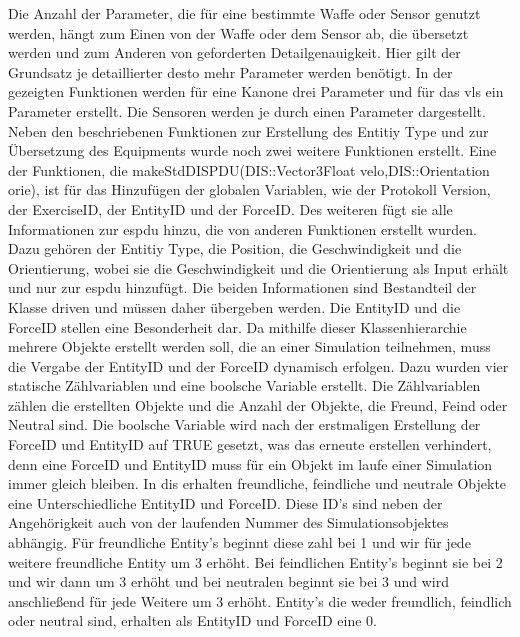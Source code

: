 Die Anzahl der Parameter, die für eine bestimmte Waffe oder Sensor genutzt werden, hängt zum Einen von der Waffe oder dem Sensor ab, die übersetzt werden und zum Anderen von geforderten Detailgenauigkeit. Hier gilt der Grundsatz je detaillierter desto mehr Parameter werden benötigt. In der gezeigten Funktionen werden für eine Kanone drei Parameter und für das \ac{vls} ein Parameter  erstellt. Die Sensoren werden je durch einen Parameter dargestellt.\\ 
Neben den beschriebenen Funktionen zur Erstellung des \glqq Entitiy Type\grqq{} und zur Übersetzung des Equipments wurde noch zwei weitere Funktionen erstellt. Eine der Funktionen, die  \glqq makeStdDISPDU(DIS::Vector3Float velo,DIS::Orientation orie)\grqq{}, ist für das Hinzufügen der globalen Variablen, wie der Protokoll Version, der ExerciseID, der EntityID und der ForceID. Des weiteren fügt sie alle Informationen zur \ac{espdu} hinzu, die von anderen Funktionen erstellt wurden. Dazu gehören der \glqq Entitiy Type\grqq{}, die Position, die Geschwindigkeit und die Orientierung, wobei sie die Geschwindigkeit und die  Orientierung als Input erhält und nur zur \ac{espdu} hinzufügt. Die beiden Informationen sind Bestandteil der Klasse \glqq driven\grqq{} und müssen daher übergeben werden. Die EntityID und die ForceID stellen eine Besonderheit dar. Da mithilfe dieser Klassenhierarchie mehrere Objekte erstellt werden soll, die an einer Simulation teilnehmen, muss die Vergabe der EntityID und der ForceID dynamisch erfolgen.  
Dazu wurden vier statische Zählvariablen und eine boolsche Variable erstellt. Die Zählvariablen zählen die erstellten Objekte und die Anzahl der Objekte, die Freund, Feind oder Neutral sind. Die boolsche Variable wird nach der erstmaligen Erstellung der ForceID und EntityID auf \glqq TRUE\grqq{} gesetzt, was das erneute erstellen verhindert, denn eine ForceID und EntityID  muss für ein Objekt im laufe einer Simulation immer gleich bleiben. In \ac{dis} erhalten freundliche, feindliche und neutrale Objekte eine Unterschiedliche EntityID und ForceID. Diese ID's sind neben der Angehörigkeit auch von der laufenden Nummer des Simulationsobjektes abhängig. Für freundliche Entity's beginnt diese zahl bei 1 und wir für jede weitere freundliche Entity um 3 erhöht. Bei feindlichen Entity's beginnt sie bei 2 und wir dann um 3 erhöht und bei neutralen beginnt sie bei 3 und wird anschließend für jede Weitere um 3 erhöht. Entity's die weder freundlich, feindlich oder neutral sind, erhalten als EntityID und ForceID eine 0. 
